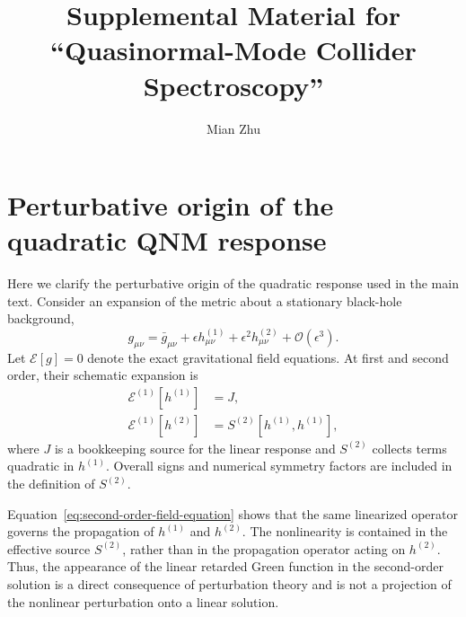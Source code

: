 \documentclass[
 reprint,
 amsmath,amssymb,
 aps,
 prl,
 superscriptaddress,
 nofootinbib
]{revtex4-2}
\begin{document}
\title{Supplemental Material for ``Quasinormal-Mode Collider Spectroscopy''}

\author{Mian Zhu}

\maketitle

\section{Perturbative origin of the quadratic QNM response}
\label{sec:quadratic-response}

Here we clarify the perturbative origin of the quadratic response used in the main text. Consider an expansion of the metric about a stationary black-hole background,
\begin{equation}
	g_{\mu\nu}
	=
	\bar g_{\mu\nu}
	+\epsilon h_{\mu\nu}^{(1)}
	+\epsilon^2 h_{\mu\nu}^{(2)}
	+\mathcal O(\epsilon^3).
\end{equation}
Let \(\mathcal E[g]=0\) denote the exact gravitational field equations. At first and second order, their schematic expansion is
\begin{align}
	\mathcal E^{(1)}[h^{(1)}] &= J, \\
	\mathcal E^{(1)}[h^{(2)}]
	&=
	S^{(2)}[h^{(1)},h^{(1)}],
	\label{eq:second-order-field-equation}
\end{align}
where \(J\) is a bookkeeping source for the linear response and
\(S^{(2)}\) collects terms quadratic in \(h^{(1)}\). Overall signs and numerical symmetry factors are included in the definition of \(S^{(2)}\).

Equation~\eqref{eq:second-order-field-equation} shows that the same linearized operator governs the propagation of \(h^{(1)}\) and \(h^{(2)}\). The nonlinearity is contained in the effective source \(S^{(2)}\), rather than in the propagation operator acting on \(h^{(2)}\). Thus, the appearance of the linear retarded Green function in the second-order solution is a direct consequence of perturbation theory and is not a projection of the nonlinear perturbation onto a linear solution.
\end{document}
